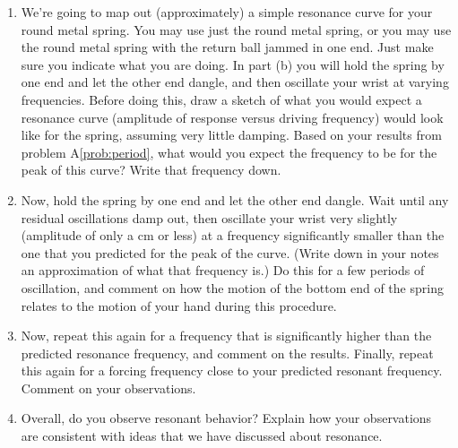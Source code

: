 \begin{exercise}[Resonance]
  \begin{enumerate}
  \item We're going to map out (approximately) a simple resonance
    curve for your round metal spring.  You may use just the round
    metal spring, or you may use the round metal spring with the
    return ball jammed in one end.  Just make sure you indicate what
    you are doing.  In part (b) you will hold the spring by one end
    and let the other end dangle, and then oscillate your wrist at
    varying frequencies.  Before doing this, draw a sketch of what you
    would expect a resonance curve (amplitude of response versus
    driving frequency) would look like for the spring, assuming very
    little damping.  Based on your results from problem
    A\ref{prob:period}, what would you expect the frequency to be for
    the peak of this curve?  Write that frequency down.

  \item Now, hold the spring by one end and let the other end dangle.
    Wait until any residual oscillations damp out, then oscillate your
    wrist very slightly (amplitude of only a cm or less) at a
    frequency significantly smaller than the one that you predicted
    for the peak of the curve.  (Write down in your notes an
    approximation of what that frequency is.)  Do this for a few
    periods of oscillation, and comment on how the motion of the
    bottom end of the spring relates to the motion of your hand during
    this procedure.

  \item Now, repeat this again for a frequency that is significantly
    higher than the predicted resonance frequency, and comment on the
    results.  Finally, repeat this again for a forcing frequency close
    to your predicted resonant frequency.  Comment on your
    observations.

  \item Overall, do you observe resonant behavior?  Explain how your
    observations are consistent with ideas that we have discussed
    about resonance.
  \end{enumerate}
\end{exercise}



